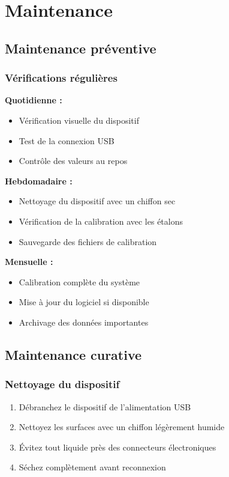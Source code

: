 \documentclass[12pt,a4paper]{article}
\begin{document}
\section{Maintenance}

\subsection{Maintenance préventive}

\subsubsection{Vérifications régulières}

\textbf{Quotidienne :}
\begin{itemize}
    \item Vérification visuelle du dispositif
    \item Test de la connexion USB
    \item Contrôle des valeurs au repos
\end{itemize}

\textbf{Hebdomadaire :}
\begin{itemize}
    \item Nettoyage du dispositif avec un chiffon sec
    \item Vérification de la calibration avec les étalons
    \item Sauvegarde des fichiers de calibration
\end{itemize}

\textbf{Mensuelle :}
\begin{itemize}
    \item Calibration complète du système
    \item Mise à jour du logiciel si disponible
    \item Archivage des données importantes
\end{itemize}

\subsection{Maintenance curative}

\subsubsection{Nettoyage du dispositif}

\begin{enumerate}
    \item Débranchez le dispositif de l'alimentation USB
    \item Nettoyez les surfaces avec un chiffon légèrement humide
    \item Évitez tout liquide près des connecteurs électroniques
    \item Séchez complètement avant reconnexion
\end{enumerate}
\end{document}

